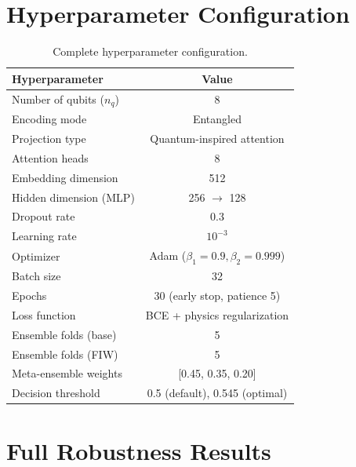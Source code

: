 \documentclass[journal,12pt]{IEEEtran}
\begin{document}
\section{Hyperparameter Configuration}
\label{sec:hyperparams}

\begin{table}[H]
    \centering
    \caption{Complete hyperparameter configuration.}
    \label{tab:hyperparams}
    \begin{tabular}{lc}
        \toprule
        \textbf{Hyperparameter} & \textbf{Value} \\
        \midrule
        Number of qubits ($n_q$) & 8 \\
        Encoding mode & Entangled \\
        Projection type & Quantum-inspired attention \\
        Attention heads & 8 \\
        Embedding dimension & 512 \\
        Hidden dimension (MLP) & 256 $\to$ 128 \\
        Dropout rate & 0.3 \\
        Learning rate & $10^{-3}$ \\
        Optimizer & Adam ($\beta_1\!=\!0.9, \beta_2\!=\!0.999$) \\
        Batch size & 32 \\
        Epochs & 30 (early stop, patience 5) \\
        Loss function & BCE + physics regularization \\
        Ensemble folds (base) & 5 \\
        Ensemble folds (FIW) & 5 \\
        Meta-ensemble weights & [0.45, 0.35, 0.20] \\
        Decision threshold & 0.5 (default), 0.545 (optimal) \\
        \bottomrule
    \end{tabular}
\end{table}

\section{Full Robustness Results}
\label{sec:full_robustness}
\end{document}

